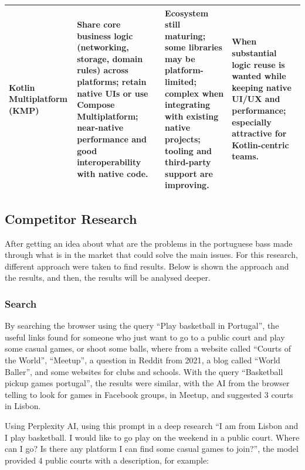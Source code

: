 \begin{table}[ht]
\begin{tabularx}{\textwidth}{|p{3.2cm}|Y|Y|Y|}
        \hline

        Kotlin Multiplatform (KMP) &
        Share core business logic (networking, storage, domain rules) across platforms; retain native UIs or use Compose Multiplatform; near-native performance and good interoperability with native code. &
        Ecosystem still maturing; some libraries may be platform-limited; complex when integrating with existing native projects; tooling and third-party support are improving. &
        When  substantial logic reuse is wanted while keeping native UI/UX and performance; especially attractive for Kotlin-centric teams. \\
        \hline
    \end{tabularx}
\end{table}


\subsection{Competitor Research}\label{subsec:competitor-research}

After getting an idea about what are the problems in the portuguese bass made through what is in the market that could solve the main issues.
For this research, different approach were taken to find results.
Below is shown the approach and the results, and then, the results will be analysed deeper.


\subsubsection{Search}
By searching the browser using the query ``Play basketball in Portugal'', the useful links found for someone who just want to go to a public court and play some casual games, or shoot some balls, where from a website called ``Courts of the World''\cite{fiba-courts}, ``Meetup''\cite{meetup}, a question in Reddit from 2021\cite{reddit}, a blog called ``World Baller''\cite{worldBaller}, and some websites for clubs and schools.
With the query ``Basketball pickup games portugal'', the results were similar, with the AI from the browser telling to look for games in Facebook groups, in Meetup, and suggested 3 courts in Lisbon.

Using Perplexity AI, using this prompt in a deep research ``I am from Lisbon and  I play basketball.
I would like to go play on the weekend in a public court.
Where can I go?
Is there any platform I can find some casual games to join?''\cite{perplexity}, the model provided 4 public courts with a description, for example:

